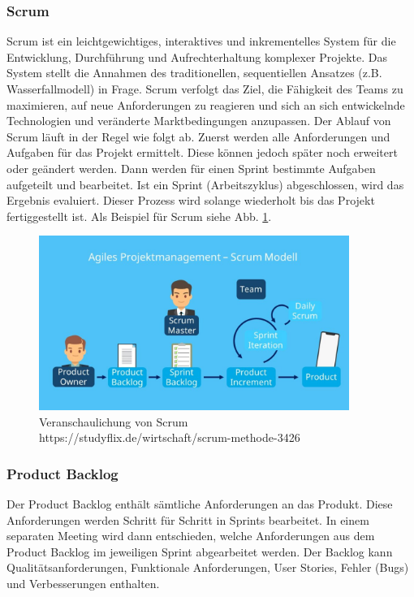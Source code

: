 \subsubsection{Scrum}
Scrum ist ein leichtgewichtiges, interaktives und inkrementelles System für die Entwicklung, 
Durchführung und Aufrechterhaltung komplexer Projekte. Das System stellt die Annahmen des 
traditionellen, sequentiellen Ansatzes (z.B. Wasserfallmodell) in Frage.
Scrum verfolgt das Ziel, die Fähigkeit des Teams zu maximieren, auf neue 
Anforderungen zu reagieren und sich an sich entwickelnde Technologien und veränderte 
Marktbedingungen anzupassen. 
\newline
\newline
Der Ablauf von Scrum läuft in der Regel wie folgt ab. Zuerst werden alle Anforderungen 
und Aufgaben für das Projekt ermittelt. Diese können jedoch später noch erweitert oder geändert werden.
Dann werden für einen Sprint bestimmte Aufgaben aufgeteilt und bearbeitet. 
Ist ein Sprint (Arbeitszyklus) abgeschlossen, wird das Ergebnis evaluiert. 
Dieser Prozess wird solange wiederholt bis das Projekt fertiggestellt ist.
Als Beispiel für Scrum siehe Abb. \ref{fig:scrum}. \cite{noauthor_scrum_2022}

\begin{figure}[H]
    \includegraphics[width=0.9\textwidth]{pics/ScrumAblauf.jpg}
    \centering
    \caption{Veranschaulichung von Scrum https://studyflix.de/wirtschaft/scrum-methode-3426}
    \label{fig:scrum}
\end{figure}

\subsubsection{Product Backlog}
Der Product Backlog enthält sämtliche Anforderungen an das Produkt. Diese Anforderungen werden 
Schritt für Schritt in Sprints bearbeitet. In einem separaten Meeting wird dann entschieden, 
welche Anforderungen aus dem Product Backlog im jeweiligen Sprint abgearbeitet werden. Der Backlog
kann Qualitätsanforderungen, Funktionale Anforderungen, User Stories, Fehler (Bugs) und 
Verbesserungen enthalten. \cite{noauthor_scrum_nodate}


